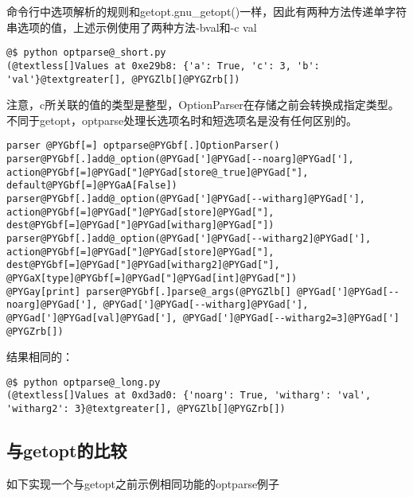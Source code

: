 \documentclass[letterpaper,10pt,english]{manual}
\begin{document}
命令行中选项解析的规则和getopt.gnu\_getopt()一样，因此有两种方法传递单字符串选项的值，上述示例使用了两种方法-bval和-c val

\begin{Verbatim}[commandchars=@\[\]]
@$ python optparse@_short.py
(@textless[]Values at 0xe29b8: {'a': True, 'c': 3, 'b': 'val'}@textgreater[], @PYGZlb[]@PYGZrb[])
\end{Verbatim}

注意，c所关联的值的类型是整型，OptionParser在存储之前会转换成指定类型。不同于getopt，optparse处理长选项名时和短选项名是没有任何区别的。

\begin{Verbatim}[commandchars=@\[\]]
parser @PYGbf[=] optparse@PYGbf[.]OptionParser()
parser@PYGbf[.]add@_option(@PYGad[']@PYGad[--noarg]@PYGad['], action@PYGbf[=]@PYGad["]@PYGad[store@_true]@PYGad["], default@PYGbf[=]@PYGaA[False])
parser@PYGbf[.]add@_option(@PYGad[']@PYGad[--witharg]@PYGad['], action@PYGbf[=]@PYGad["]@PYGad[store]@PYGad["], dest@PYGbf[=]@PYGad["]@PYGad[witharg]@PYGad["])
parser@PYGbf[.]add@_option(@PYGad[']@PYGad[--witharg2]@PYGad['], action@PYGbf[=]@PYGad["]@PYGad[store]@PYGad["], dest@PYGbf[=]@PYGad["]@PYGad[witharg2]@PYGad["], @PYGaX[type]@PYGbf[=]@PYGad["]@PYGad[int]@PYGad["])
@PYGay[print] parser@PYGbf[.]parse@_args(@PYGZlb[] @PYGad[']@PYGad[--noarg]@PYGad['], @PYGad[']@PYGad[--witharg]@PYGad['], @PYGad[']@PYGad[val]@PYGad['], @PYGad[']@PYGad[--witharg2=3]@PYGad['] @PYGZrb[])
\end{Verbatim}

结果相同的：

\begin{Verbatim}[commandchars=@\[\]]
@$ python optparse@_long.py
(@textless[]Values at 0xd3ad0: {'noarg': True, 'witharg': 'val', 'witharg2': 3}@textgreater[], @PYGZlb[]@PYGZrb[])
\end{Verbatim}


\subsection{与getopt的比较}

如下实现一个与getopt之前示例相同功能的optparse例子
\end{document}
